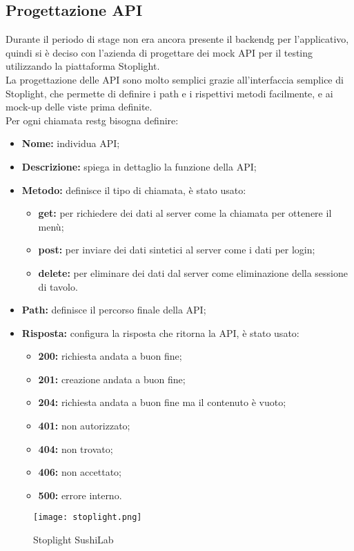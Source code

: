 \subsection{Progettazione API}
Durante il periodo di stage non era ancora presente il \gls{backendg} per l'applicativo, quindi si è deciso con l'azienda di progettare dei mock API per il testing utilizzando la piattaforma Stoplight.\\
La progettazione delle API sono molto semplici grazie all'interfaccia semplice di Stoplight, che permette di definire i path e i rispettivi metodi facilmente, e ai mock-up delle viste prima definite.\\
Per ogni chiamata \gls{restg} bisogna definire:
\begin{itemize}
    \item \textbf{Nome:} individua API;
    \item \textbf{Descrizione:} spiega in dettaglio la funzione della API;
    \item \textbf{Metodo:} definisce il tipo di chiamata, è stato usato:
    \begin{itemize}
        \item  \textbf{get:} per richiedere dei dati al server come la chiamata per ottenere il menù;
        \item  \textbf{post:} per inviare dei dati sintetici al server come i dati per login;
        \item  \textbf{delete:} per eliminare dei dati dal server come eliminazione della sessione di tavolo.
    \end{itemize}
    \item \textbf{Path:} definisce il percorso finale della API;
    \item \textbf{Risposta:} configura la risposta che ritorna la API, è stato usato:
    \begin{itemize}
        \item  \textbf{200:} richiesta andata a buon fine;
        \item  \textbf{201:} creazione andata a buon fine;
        \item  \textbf{204:} richiesta andata a buon fine ma il contenuto è vuoto;
        \item  \textbf{401:} non autorizzato;
        \item  \textbf{404:} non trovato;
        \item  \textbf{406:} non accettato;
        \item  \textbf{500:} errore interno.
    \end{itemize}
\end{itemize}
\begin{figure}[H]
    \centering
    \texttt{[image: stoplight.png]}
    \caption{Stoplight SushiLab}
\end{figure}

